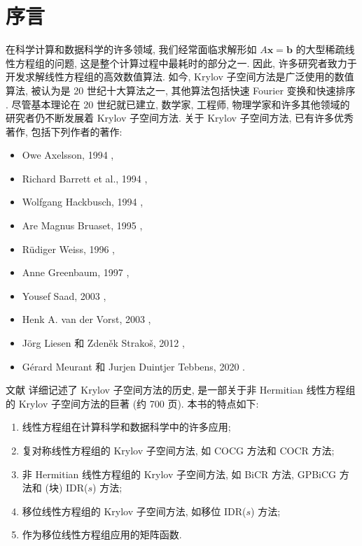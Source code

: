 \section*{{序言}}\label{sec:preface}
{在科学计算和数据科学的许多领域, 我们经常面临求解形如 $A\bm x=\bm b$ 的大型稀疏线性方程组的问题, 这是整个计算过程中最耗时的部分之一. 因此, 许多研究者致力于开发求解线性方程组的高效数值算法. 如今, Krylov 子空间方法是广泛使用的数值算法, 被认为是 20 世纪十大算法之一, 其他算法包括快速 Fourier 变换和快速排序 . 尽管基本理论在 20 世纪就已建立, 数学家, 工程师, 物理学家和许多其他领域的研究者仍不断发展着 Krylov 子空间方法.}
{关于 Krylov 子空间方法, 已有许多优秀著作, 包括下列作者的著作:}
\begin{itemize}
\item Owe Axelsson, 1994 ,
\item Richard Barrett et al., 1994 ,
\item Wolfgang Hackbusch, 1994 ,
\item Are Magnus Bruaset, 1995 ,
\item Rüdiger Weiss, 1996 ,
\item Anne Greenbaum, 1997 ,
\item Yousef Saad, 2003 ,
\item Henk A. van der Vorst, 2003 ,
\item Jörg Liesen {和} Zdeněk Strakoš, 2012 ,
\item Gérard Meurant {和} Jurjen Duintjer Tebbens, 2020 .
\end{itemize}
{文献  详细记述了 Krylov 子空间方法的历史, 是一部关于非 Hermitian 线性方程组的 Krylov 子空间方法的巨著 (约 700 页). 本书的特点如下:}
\begin{enumerate}[label=(\arabic*)]
\item {线性方程组在计算科学和数据科学中的许多应用;}
\item {复对称线性方程组的 Krylov 子空间方法, 如 COCG 方法和 COCR 方法;}
\item {非 Hermitian 线性方程组的 Krylov 子空间方法, 如 BiCR 方法, GPBiCG 方法和 (块) IDR($s$) 方法;}
\item {移位线性方程组的 Krylov 子空间方法, 如移位 IDR($s$) 方法;}
\item {作为移位线性方程组应用的矩阵函数.}
\end{enumerate}
